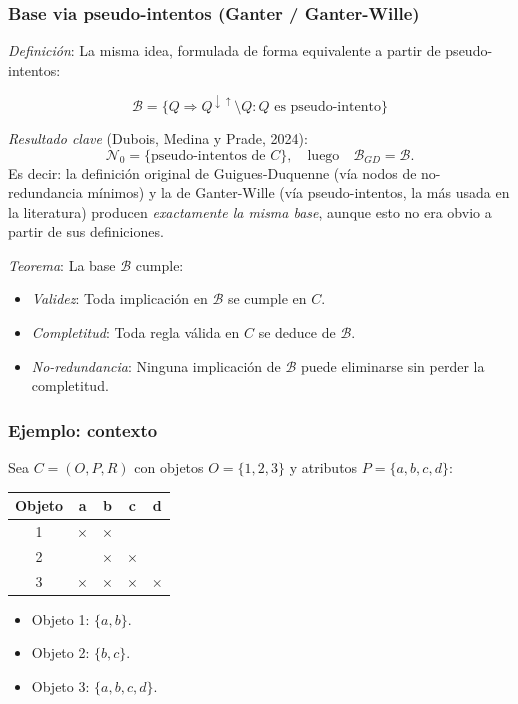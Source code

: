 \documentclass{beamer}
\begin{document}
  \begin{frame}
    \frametitle{Base via pseudo-intentos (Ganter / Ganter-Wille)}
    \textit{Definición}: La misma idea, formulada de forma
    equivalente a partir de pseudo-intentos:

    \[
      \mathcal{B} = \{Q \Rightarrow Q^{\downarrow\uparrow}\setminus Q :
      Q \text{ es pseudo-intento}\}
    \]

    \bigskip
    \pause

    \textit{Resultado clave} (Dubois, Medina y Prade, 2024):
    \[
      \mathcal{N}_0 = \{\text{pseudo-intentos de } C\},
      \quad\text{luego}\quad
      \mathcal{B}_{GD} = \mathcal{B}.
    \]
    Es decir: la definición original de Guigues-Duquenne (vía
    nodos de no-redundancia mínimos) y la de Ganter-Wille (vía
    pseudo-intentos, la más usada en la literatura) producen
    \emph{exactamente la misma base}, aunque esto no era obvio
    a partir de sus definiciones.

    \bigskip
    \pause

    \textit{Teorema}: La base $\mathcal{B}$ cumple:

    \pause
    \begin{itemize}[<+->]
      \item \textit{Validez}: Toda implicación en
        $\mathcal{B}$ se cumple en $C$.
      \item \textit{Completitud}: Toda regla válida
        en $C$ se deduce de $\mathcal{B}$.
      \item \textit{No-redundancia}: Ninguna implicación
        de $\mathcal{B}$ puede eliminarse sin perder la
        completitud.
    \end{itemize}
  \end{frame}

  \begin{frame}
    \frametitle{Ejemplo: contexto}
    Sea $C = (O, P, R)$ con objetos $O = \{1, 2, 3\}$
    y atributos $P = \{a, b, c, d\}$:

    \bigskip
    \pause

    \begin{center}
      \begin{tabular}{|c|c|c|c|c|}
        \hline
        \textbf{Objeto} & \textbf{a} & \textbf{b} &
        \textbf{c} & \textbf{d} \\ \hline
        1 & $\times$ & $\times$ & & \\ \hline
        2 & & $\times$ & $\times$ & \\ \hline
        3 & $\times$ & $\times$ & $\times$ & $\times$ \\ \hline
      \end{tabular}
    \end{center}

    \pause
    \begin{itemize}[<+->]
      \item Objeto 1: $\{a, b\}$.
      \item Objeto 2: $\{b, c\}$.
      \item Objeto 3: $\{a, b, c, d\}$.
    \end{itemize}
  \end{frame}
\end{document}
